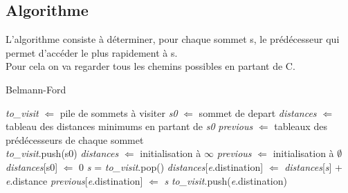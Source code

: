 \documentclass[11pt]{extarticle}
\begin{document}
\subsection{Algorithme}
L'algorithme consiste à déterminer, pour chaque sommet s, le prédécesseur qui permet d'accéder le plus rapidement à s.\\
Pour cela on va regarder tous les chemins possibles en partant de C.
\begin{algorithm}
\caption{Belmann-Ford}\label{belmann-ford}
\begin{algorithmic}
    \State \textit{to\_visit} $\Leftarrow$ pile de sommets à visiter
    \State \textit{s0} $\Leftarrow$ sommet de depart
    \State \textit{distances} $\Leftarrow$ tableau des distances minimums en partant de \textit{s0}
    \State \textit{previous} $\Leftarrow$ tableaux des prédécesseurs de chaque sommet
    \\
	\State \textit{to\_visit}.push(s0)
	\State \textit{distances} $\Leftarrow$ initialisation à $\infty$
	\State \textit{previous} $\Leftarrow$ initialisation à $\emptyset$
	\State \textit{distances}[s0] $\Leftarrow$ 0
    	\State \textit{s} = \textit{to\_visit}.pop()
    			\State \textit{distances}[\textit{e}.distination] $\Leftarrow$ \textit{distances}[\textit{s}] + \textit{e}.distance
    			\State \textit{previous}[\textit{e}.distination] $\Leftarrow$ \textit{s}
    				\State \textit{to\_visit}.push(\textit{e}.distination)
    			\EndIf
    		\EndIf
    	\EndFor
    \EndWhile
\end{algorithmic}
\end{algorithm}
\end{document}
